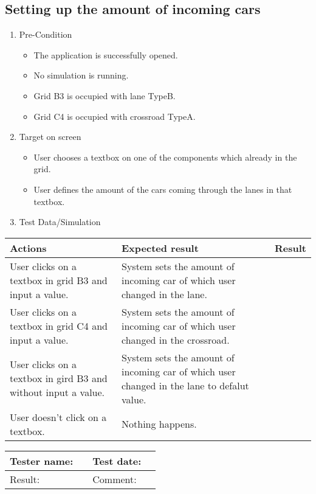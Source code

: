 \newpage

\subsection{Setting up the amount of incoming cars }

\begin{enumerate}
	\item Pre-Condition
	\begin{itemize}
		\item The application is successfully opened.
		\item No simulation is running.
		\item Grid B3 is occupied with lane TypeB.
		\item Grid C4 is occupied with crossroad TypeA.
	\end{itemize}
	\item Target on screen
	\begin{itemize}
		\item User chooses a textbox on one of the components which already in the grid.
		\item User defines the amount of the cars coming through the lanes in that textbox.
	\end{itemize}
	\item Test Data/Simulation
\end{enumerate}	
	\begin{tabularx}{\textwidth}{|X|X|p{2.5cm}|}\hline
		Actions & Expected result & Result \\\hline
		User clicks on a textbox in grid B3 and input a value. & System sets the amount of incoming car of which user changed in the lane. & \pass \\\hline
		User clicks on a textbox in grid C4 and input a value. & System sets the amount of incoming car of which user changed in the crossroad. & \pass \\\hline
		User clicks on a textbox in gird B3 and without input a value. & System sets the amount of incoming car of which user changed in the lane to defalut value. & \pass \\\hline
		User doesn't click on a textbox. & Nothing happens. &  \pass \\\hline
	\end{tabularx}
	

\begin{tabularx}{\textwidth}{|p{3cm}X|p{3cm}X|}\hline
	Tester name: &  & Test date: & \\\hline
	Result: &   \pass & Comment: & \\\hline
\end{tabularx}

